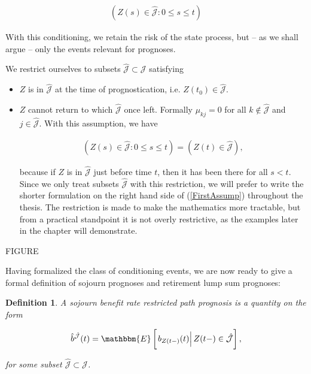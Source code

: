 \documentclass{article}
\newcommand{\1}[1]{\mathbbm{1}_{\left\lbrace #1 \right\rbrace}}
\newcommand{\econd}[2][def]{\mathbbm{E} \left[ \left. #1 \right| #2 \right]}
\theoremstyle{break}
\newtheorem{definition}{Definition}[section]
\theoremstyle{remark}
\numberwithin{equation}{section}
\begin{document}
\begin{align} \label{FirstCond}
	\left( Z(s) \in \hat{\mathcal{J}} : 0 \leq s \leq t \right)
\end{align}

With this conditioning, we retain the risk of the state process, but -- as we shall argue -- only the events relevant for prognoses.

We restrict ourselves to subsets $\hat{\mathcal{J}} \subset \mathcal{J}$ satisfying

\begin{itemize}
	\item $Z$ is in $\hat{\mathcal{J}}$ at the time of prognostication, i.e. $Z(t_0) \in \hat{\mathcal{J}}$.
	\item $Z$ cannot return to which $\hat{\mathcal{J}}$ once left. Formally $\mu_{kj} = 0$ for all $k \notin \hat{\mathcal{J}}$ and $j \in \hat{\mathcal{J}}$. With this assumption, we have
	
	\begin{align} \label{FirstAssump}
		\left( Z(s) \in \hat{\mathcal{J}} : 0 \leq s \leq t \right) = \left( Z(t) \in \hat{\mathcal{J}} \right),
	\end{align}
	
	because if $Z$ is in $\hat{\mathcal{J}}$ just before time $t$, then it has been there for all $s < t$. Since we only treat subsets $\hat{\mathcal{J}}$ with this restriction, we will prefer to write the shorter formulation on the right hand side of (\ref{FirstAssump}) throughout the thesis. The restriction is made to make the mathematics more tractable, but from a practical standpoint it is not overly restrictive, as the examples later in the chapter will demonstrate. 
\end{itemize}


FIGURE

Having formalized the class of conditioning events, we are now ready to give a formal definition of sojourn prognoses and retirement lump sum prognoses:

\begin{definition} \label{DefSojRestr}
	A sojourn benefit rate restricted path prognosis is a quantity on the form
	
	\begin{gather*}
		\hat{b}^{\hat{\mathcal{J}}}(t) = \econd[b_{Z(t-)}(t)]{Z(t-) \in \hat{\mathcal{J}}},
	\end{gather*}
	
	for some subset $\hat{\mathcal{J}} \subset \mathcal{J}$.
\end{definition}
\end{document}
